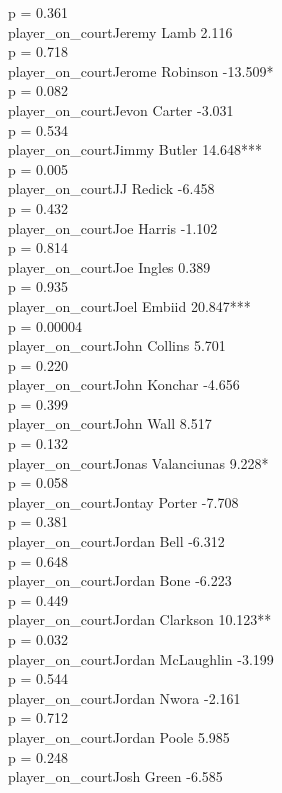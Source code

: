 \documentclass[
  landscape]{article}
\begin{document}
p = 0.361\\
player\_on\_courtJeremy Lamb 2.116\\
p = 0.718\\
player\_on\_courtJerome Robinson -13.509*\\
p = 0.082\\
player\_on\_courtJevon Carter -3.031\\
p = 0.534\\
player\_on\_courtJimmy Butler 14.648***\\
p = 0.005\\
player\_on\_courtJJ Redick -6.458\\
p = 0.432\\
player\_on\_courtJoe Harris -1.102\\
p = 0.814\\
player\_on\_courtJoe Ingles 0.389\\
p = 0.935\\
player\_on\_courtJoel Embiid 20.847***\\
p = 0.00004\\
player\_on\_courtJohn Collins 5.701\\
p = 0.220\\
player\_on\_courtJohn Konchar -4.656\\
p = 0.399\\
player\_on\_courtJohn Wall 8.517\\
p = 0.132\\
player\_on\_courtJonas Valanciunas 9.228*\\
p = 0.058\\
player\_on\_courtJontay Porter -7.708\\
p = 0.381\\
player\_on\_courtJordan Bell -6.312\\
p = 0.648\\
player\_on\_courtJordan Bone -6.223\\
p = 0.449\\
player\_on\_courtJordan Clarkson 10.123**\\
p = 0.032\\
player\_on\_courtJordan McLaughlin -3.199\\
p = 0.544\\
player\_on\_courtJordan Nwora -2.161\\
p = 0.712\\
player\_on\_courtJordan Poole 5.985\\
p = 0.248\\
player\_on\_courtJosh Green -6.585\\
\end{document}
